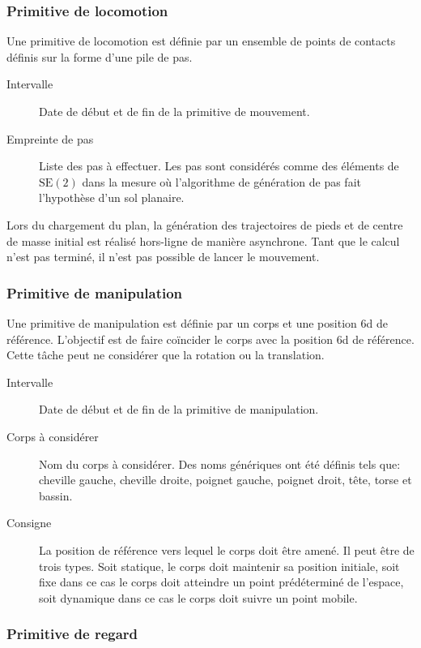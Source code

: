 \subsubsection{Primitive de locomotion}

Une primitive de locomotion est définie par un ensemble de points de
contacts définis sur la forme d'une pile de pas.

\begin{description}
\item[Intervalle] Date de début et de fin de la primitive de mouvement.
\item[Empreinte de pas] Liste des pas à effectuer. Les pas sont
  considérés comme des éléments de $\text{SE}(2)$ dans la mesure où
  l'algorithme de génération de pas fait l'hypothèse d'un sol
  planaire.
\end{description}

Lors du chargement du plan, la génération des trajectoires de pieds et
de centre de masse initial est réalisé hors-ligne de manière
asynchrone. Tant que le calcul n'est pas terminé, il n'est pas
possible de lancer le mouvement.


\subsubsection{Primitive de manipulation}

Une primitive de manipulation est définie par un corps et une position
6d de référence. L'objectif est de faire coïncider le corps avec la
position 6d de référence. Cette tâche peut ne considérer que la
rotation ou la translation.

\begin{description}
\item[Intervalle] Date de début et de fin de la primitive de manipulation.
\item[Corps à considérer] Nom du corps à considérer. Des noms
  génériques ont été définis tels que: cheville gauche, cheville
  droite, poignet gauche, poignet droit, tête, torse et bassin.
\item[Consigne] La position de référence vers lequel le corps doit
  être amené. Il peut être de trois types. Soit statique, le corps
  doit maintenir sa position initiale, soit fixe dans ce cas le corps
  doit atteindre un point prédéterminé de l'espace, soit dynamique
  dans ce cas le corps doit suivre un point mobile.
\end{description}


\subsubsection{Primitive de regard}

